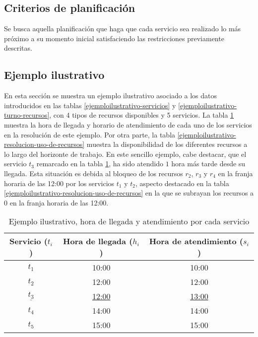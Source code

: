 \subsection{Criterios de planificación}

Se busca aquella planificación que haga que cada servicio sea realizado lo más próximo a su momento inicial satisfaciendo las restricciones previamente descritas.

\subsection{Ejemplo ilustrativo}

En esta sección se muestra un ejemplo ilustrativo asociado a los datos introducidos en las tablas \ref{ejemploilustrativo-servicios} y \ref{ejemploilustrativo-turno-recursos}, con 4 tipos de recursos disponibles y 5 servicios. La tabla \ref{ejemploilustrativo-resolucion} muestra la hora de llegada y horario de atendimiento de cada uno de los servicios en la resolución de este ejemplo. Por otra parte, la tabla \ref{ejemploilustrativo-resolucion-uso-de-recursos} muestra la disponibilidad de los diferentes recursos a lo largo del horizonte de trabajo. En este sencillo ejemplo, cabe destacar, que el servicio $t_3$ remarcado en la tabla \ref{ejemploilustrativo-resolucion}, ha sido atendido $1$ hora más tarde  desde su llegada. Esta situación es debida al bloqueo de los recursos $r_2$, $r_3$ y $r_4$ en la franja horaria de las 12:00 por los servicios $t_1$ y $t_2$, aspecto destacado en la tabla \ref{ejemploilustrativo-resolucion-uso-de-recursos} en la que se subrayan los recursos a $0$ en la franja horaria de las 12:00.

\begin{table}
\centering
\begin{tabular}{ccc}
\toprule
    Servicio ($t_i$)& Hora de llegada ($h_i$)& Hora de atendimiento ($s_i$) \\
    \hline
    $t_1$ & 10:00 & 10:00     \\
    \cline{1-3}
    $t_2$ & 12:00 & 12:00      \\
    \cline{1-3}
    $\underline{t_3}$ & \underline{12:00} & \underline{13:00} \\
    \cline{1-3}
    $t_4$ & 14:00 & 14:00 \\
    \cline{1-3}
    $t_5$ & 15:00 & 15:00  \\
\bottomrule
\end{tabular}
\caption{Ejemplo ilustrativo, hora de llegada y atendimiento por cada servicio}
\label{ejemploilustrativo-resolucion}
\end{table}

